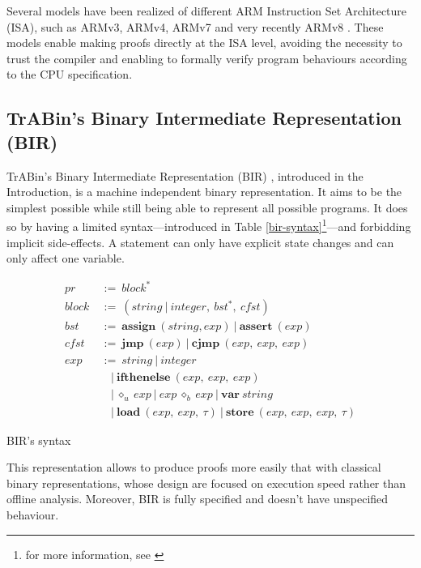 \documentclass{kththesis}
\begin{document}
Several models have been realized of different ARM Instruction Set Architecture (ISA), such as ARMv3, ARMv4, ARMv7 \cite{noauthor_canonical_2019, hutchison_trustworthy_2010} and very recently ARMv8 \cite{armstrong_isa_2019}. These models enable making proofs directly at the ISA level, avoiding the necessity to trust the compiler and enabling to formally verify program behaviours according to the CPU specification.

\subsection{TrABin's Binary Intermediate Representation (BIR)}

TrABin's Binary Intermediate Representation (BIR) \cite{lindner_trabin:_2019}, introduced in the Introduction, is a machine independent binary representation. It aims to be the simplest possible while still being able to represent all possible programs. It does so by having a limited syntax---introduced in Table \ref{bir-syntax}\footnote{for more information, see \cite{lindner_trabin:_2019}}---and forbidding implicit side-effects. A statement can only have explicit state changes and can only affect one variable.

\begin{table}
	\begin{align*}
		pr~    & :=~block^{\ast}                                                             \\
		block~ & :=~(string~|~integer,~bst^{\ast},~cfst)                                     \\
		bst~   & :=~\textbf{assign}~(string, exp)~|~\textbf{assert}~(exp)                    \\
		cfst~  & :=~\textbf{jmp}~(exp)~|~\textbf{cjmp}~(exp,~exp,~exp)                       \\
		exp~   & :=~string~|~integer                                                         \\
		       & ~~~~|~\textbf{ifthenelse}~(exp,~exp,~exp)                                   \\
		       & ~~~~|~\diamond_{u}~exp~|~exp~\diamond_{b}~exp~|~\textbf{var}~string         \\
		       & ~~~~|~\textbf{load}~(exp,~exp,~\tau)~|~\textbf{store}~(exp,~exp,~exp,~\tau) 
	\end{align*}
	\caption{BIR's syntax}
	\label{bir-syntax}
\end{table}

This representation allows to produce proofs more easily that with classical binary representations, whose design are focused on execution speed rather than offline analysis. Moreover, BIR is fully specified and doesn't have unspecified behaviour.
\end{document}
